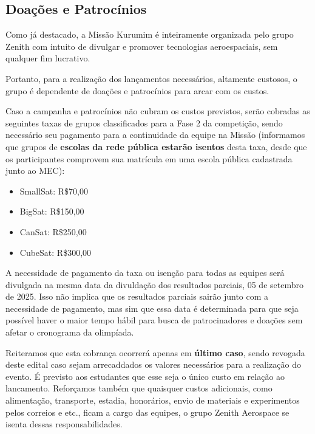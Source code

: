     \subsection{Doações e Patrocínios}
        \par Como já destacado, a Missão Kurumim é inteiramente organizada pelo grupo Zenith 
        com intuito de divulgar e promover tecnologias aeroespaciais, sem qualquer fim lucrativo.

        \par Portanto, para a realização dos lançamentos necessários, altamente custosos, 
        o grupo é dependente de doações e patrocínios para arcar com os custos.
        
        \par Caso a campanha e patrocínios não cubram os custos previstos, 
        serão cobradas as seguintes taxas de grupos classificados para a Fase 2 da competição, 
        sendo necessário seu pagamento para a continuidade da equipe na 
        Missão (informamos que grupos de \textbf{escolas da rede pública estarão isentos} desta taxa, 
        desde que os participantes comprovem sua matrícula em uma escola pública cadastrada junto ao MEC):
      
        \begin{itemize}
            \item SmallSat: R\$70,00
            \item BigSat: R\$150,00
            \item CanSat: R\$250,00
            \item CubeSat: R\$300,00
        \end{itemize}
        
        \par A necessidade de pagamento da taxa ou isenção para todas as equipes será divulgada
        na mesma data da divuldação dos resultados parciais, 05 de setembro de 2025. Isso não implica
        que os resultados parciais sairão junto com a necessidade de pagamento, mas sim que essa data 
        é determinada para que seja possível haver o maior tempo hábil para busca de patrocinadores e
        doações sem afetar o cronograma da olimpíada.

        \par Reiteramos que esta cobrança ocorrerá apenas em \textbf{último caso}, sendo revogada
        deste edital caso sejam arrecaddados os valores necessários para a realização do evento.
        É previsto aos estudantes que esse seja o único custo em relação ao lancamento. Reforçamos
        também que quaisquer custos adicionais, como alimentação, transporte, estadia, honorários,
        envio de materiais e experimentos pelos correios e etc., ficam a cargo das equipes, o grupo
        Zenith Aerospace se isenta dessas responsabilidades.

